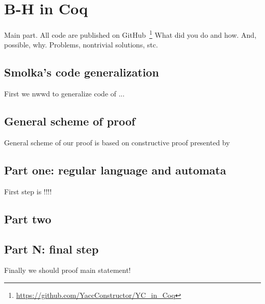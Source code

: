 \section{B-H in Coq}
Main part. 
All code are published on GitHub~\footnote{\url{https://github.com/YaccConstructor/YC\_in\_Coq}}
What did you do and how. And, possible, why. Problems, nontrivial solutions, stc.
    
\subsection{ Smolka's code generalization}

First we nwwd to generalize code of ...

\subsection{General scheme of proof}

General scheme of our proof is based on constructive proof presented by~\cite{!!!}

\subsection{Part one: regular language and automata}

First step is !!!!

\subsection{Part two}

\subsection{ Part N: final step}

Finally we should proof main statement!